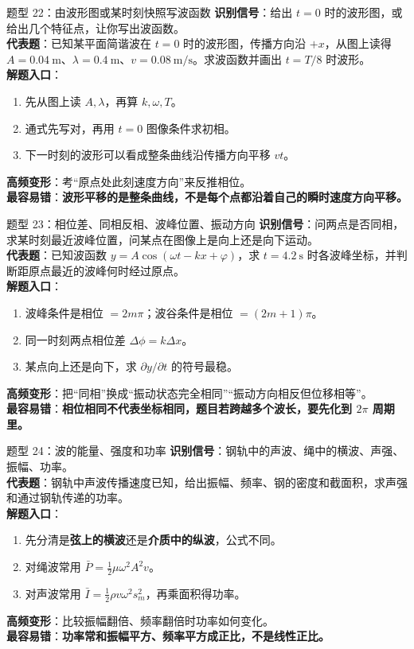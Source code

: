 \documentclass[11pt,a4paper]{ctexart}
\newcommand{\key}[1]{\textcolor{theme}{\textbf{#1}}}
\newcommand{\warn}[1]{\textcolor{red!70!black}{\textbf{#1}}}
\begin{document}
\begin{typebox}{题型 22：由波形图或某时刻快照写波函数}
\textbf{识别信号}：给出 \(t=0\) 时的波形图，或给出几个特征点，让你写出波函数。\\
\textbf{代表题}：已知某平面简谐波在 \(t=0\) 时的波形图，传播方向沿 \(+x\)，从图上读得 \(A=0.04\ \mathrm{m}\)、\(\lambda=0.4\ \mathrm{m}\)、\(v=0.08\ \mathrm{m/s}\)。求波函数并画出 \(t=T/8\) 时波形。\\
\textbf{解题入口}：
\begin{enumerate}
  \item 先从图上读 \(A,\lambda\)，再算 \(k,\omega,T\)。
  \item 通式先写对，再用 \(t=0\) 图像条件求初相。
  \item 下一时刻的波形可以看成整条曲线沿传播方向平移 \(vt\)。
\end{enumerate}
\textbf{高频变形}：考“原点处此刻速度方向”来反推相位。\\
\textbf{最容易错}：\warn{波形平移的是整条曲线，不是每个点都沿着自己的瞬时速度方向平移。}
\end{typebox}

\begin{typebox}{题型 23：相位差、同相反相、波峰位置、振动方向}
\textbf{识别信号}：问两点是否同相，求某时刻最近波峰位置，问某点在图像上是向上还是向下运动。\\
\textbf{代表题}：已知波函数 \(y=A\cos(\omega t-kx+\varphi)\)，求 \(t=4.2\ \mathrm{s}\) 时各波峰坐标，并判断距原点最近的波峰何时经过原点。\\
\textbf{解题入口}：
\begin{enumerate}
  \item 波峰条件是相位 \(=2m\pi\)；波谷条件是相位 \(=(2m+1)\pi\)。
  \item 同一时刻两点相位差 \(\Delta\phi=k\Delta x\)。
  \item 某点向上还是向下，求 \(\partial y/\partial t\) 的符号最稳。
\end{enumerate}
\textbf{高频变形}：把“同相”换成“振动状态完全相同”“振动方向相反但位移相等”。\\
\textbf{最容易错}：\warn{相位相同不代表坐标相同，题目若跨越多个波长，要先化到 \(2\pi\) 周期里。}
\end{typebox}

\begin{typebox}{题型 24：波的能量、强度和功率}
\textbf{识别信号}：钢轨中的声波、绳中的横波、声强、振幅、功率。\\
\textbf{代表题}：钢轨中声波传播速度已知，给出振幅、频率、钢的密度和截面积，求声强和通过钢轨传递的功率。\\
\textbf{解题入口}：
\begin{enumerate}
  \item 先分清是\key{弦上的横波}还是\key{介质中的纵波}，公式不同。
  \item 对绳波常用 \(\bar P=\frac12\mu\omega^2A^2v\)。
  \item 对声波常用 \(\bar I=\frac12\rho v\omega^2 s_m^2\)，再乘面积得功率。
\end{enumerate}
\textbf{高频变形}：比较振幅翻倍、频率翻倍时功率如何变化。\\
\textbf{最容易错}：\warn{功率常和振幅平方、频率平方成正比，不是线性正比。}
\end{typebox}
\end{document}
